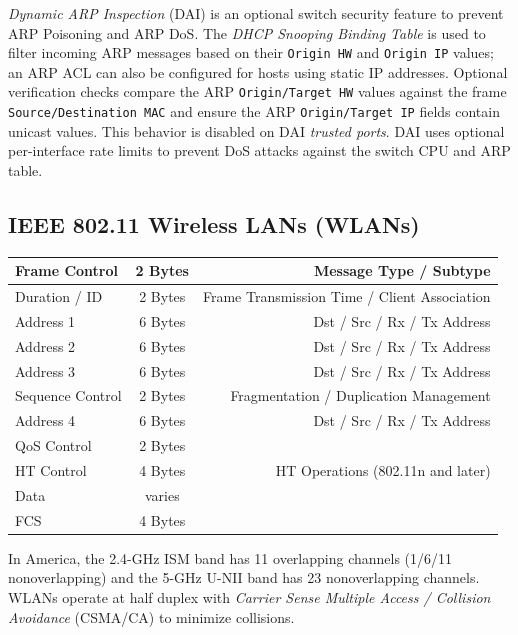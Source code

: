 \documentclass[12pt]{article}
\begin{document}
	\textit{Dynamic ARP Inspection} (DAI) is an optional switch security feature to prevent ARP Poisoning and ARP DoS. The \textit{DHCP Snooping Binding Table} is used to filter incoming ARP messages based on their \texttt{Origin HW} and \texttt{Origin IP} values; an ARP ACL can also be configured for hosts using static IP addresses. Optional verification checks compare the ARP \texttt{Origin/Target HW} values against the frame \texttt{Source/Destination MAC} and ensure the ARP \texttt{Origin/Target IP} fields contain unicast values. This behavior is disabled on DAI \textit{trusted ports}. DAI uses optional per-interface rate limits to prevent DoS attacks against the switch CPU and ARP table.


	\subsection[IEEE 802.11 WLANs]{IEEE 802.11 Wireless LANs (WLANs) \label{subsec:802.11 WLANS}}
	\begin{table}[H]
	\centering
	\begin{tabular}{| l | c | r |}
	\hline
	Frame Control		& 2 Bytes	& Message Type / Subtype\\\hline
	Duration / ID		& 2 Bytes	& Frame Transmission Time / Client Association\\\hline
	Address 1			& 6 Bytes	& Dst / Src / Rx / Tx Address\\\hline
	Address 2			& 6 Bytes	& Dst / Src / Rx / Tx Address\\\hline
	Address 3			& 6 Bytes	& Dst / Src / Rx / Tx Address\\\hline
	Sequence Control		& 2 Bytes	& Fragmentation / Duplication Management\\\hline
	Address 4			& 6 Bytes	& Dst / Src / Rx / Tx Address\\\hline
	QoS Control		& 2 Bytes	& \Cref{sec:QOS}\\\hline
	HT Control			& 4 Bytes	& HT Operations (802.11n and later)\\\hline
	Data				& varies	&\\\hline
	FCS				& 4 Bytes	&\\\hline
	\end{tabular}\end{table}
	In America, the 2.4-GHz ISM band has 11 overlapping channels (1/6/11 nonoverlapping) and the 5-GHz U-NII band has 23 nonoverlapping channels. WLANs operate at half duplex with \textit{Carrier Sense Multiple Access / Collision Avoidance} (CSMA/CA) to minimize collisions.
	
\end{document}
